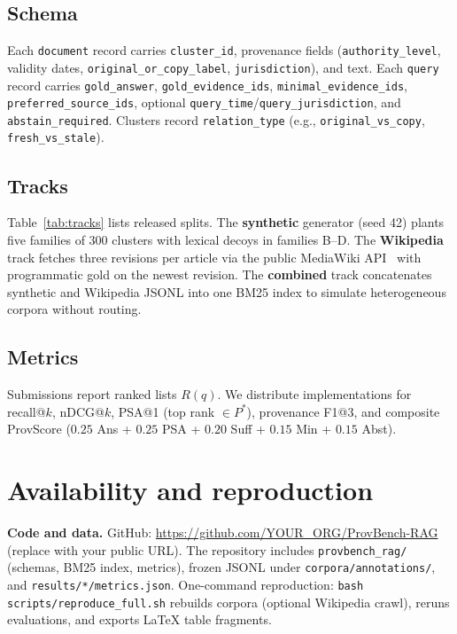\documentclass[sigconf]{acmart}
\begin{document}
\subsection{Schema}
Each \texttt{document} record carries \texttt{cluster\_id}, provenance fields (\texttt{authority\_level}, validity dates, \texttt{original\_or\_copy\_label}, \texttt{jurisdiction}), and text.
Each \texttt{query} record carries \texttt{gold\_answer}, \texttt{gold\_evidence\_ids}, \texttt{minimal\_evidence\_ids}, \texttt{preferred\_source\_ids}, optional \texttt{query\_time}/\texttt{query\_jurisdiction}, and \texttt{abstain\_required}.
Clusters record \texttt{relation\_type} (e.g., \texttt{original\_vs\_copy}, \texttt{fresh\_vs\_stale}).

\subsection{Tracks}
Table~\ref{tab:tracks} lists released splits.
The \textbf{synthetic} generator (seed 42) plants five families of 300 clusters with lexical decoys in families B--D.
The \textbf{Wikipedia} track fetches three revisions per article via the public MediaWiki API~\cite{wiki_api} with programmatic gold on the newest revision.
The \textbf{combined} track concatenates synthetic and Wikipedia JSONL into one BM25 index to simulate heterogeneous corpora without routing.

\begin{table}[t]
  \centering
  \footnotesize
  \caption{ProvBench-RAG v1 tracks shipped in the artifact.}
  \label{tab:tracks}
  
\end{table}

\subsection{Metrics}
Submissions report ranked lists $R(q)$.
We distribute implementations for recall@$k$, nDCG@$k$, PSA@1 (top rank $\in P^\ast$), provenance F1@3, and composite ProvScore ($0.25$ Ans + $0.25$ PSA + $0.20$ Suff + $0.15$ Min + $0.15$ Abst).

\section{Availability and reproduction}
\label{sec:avail}
\textbf{Code and data.} GitHub: \url{https://github.com/YOUR\_ORG/ProvBench-RAG} (replace with your public URL).
The repository includes \texttt{provbench\_rag/} (schemas, BM25 index, metrics), frozen JSONL under \texttt{corpora/annotations/}, and \texttt{results/*/metrics.json}.
One-command reproduction: \texttt{bash scripts/reproduce\_full.sh} rebuilds corpora (optional Wikipedia crawl), reruns evaluations, and exports LaTeX table fragments.
\end{document}
